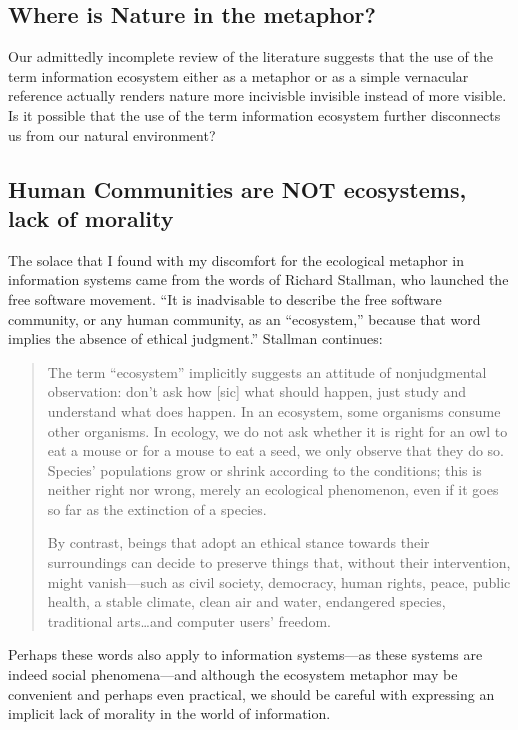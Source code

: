 \subsection{Where is Nature in the metaphor?}

Our admittedly incomplete review of the literature suggests that the use of the term information ecosystem either as a metaphor or as a simple vernacular reference actually renders nature more incivisble invisible instead of more visible. Is it possible that the use of the term information ecosystem further disconnects us from our natural environment?  

\subsection{Human Communities are NOT ecosystems, lack of morality}

The solace that I found with my discomfort for the ecological metaphor in information systems came from the words of Richard Stallman, who launched the free software movement. “It is inadvisable to describe the free software community, or any human community, as an “ecosystem,” because that word implies the absence of ethical judgment.”  Stallman continues:
 
\begin{quote}The term “ecosystem” implicitly suggests an attitude of nonjudgmental observation: don't ask how [sic] what should happen, just study and understand what does happen. In an ecosystem, some organisms consume other organisms. In ecology, we do not ask whether it is right for an owl to eat a mouse or for a mouse to eat a seed, we only observe that they do so. Species' populations grow or shrink according to the conditions; this is neither right nor wrong, merely an ecological phenomenon, even if it goes so far as the extinction of a species.

By contrast, beings that adopt an ethical stance towards their surroundings can decide to preserve things that, without their intervention, might vanish—such as civil society, democracy, human rights, peace, public health, a stable climate, clean air and water, endangered species, traditional arts…and computer users' freedom. \cite{fsf_2014}\end{quote}

Perhaps these words also apply to information systems—as these systems are indeed social phenomena—and although the ecosystem metaphor may be convenient and perhaps even practical, we should be careful with expressing an implicit lack of morality in the world of information.
